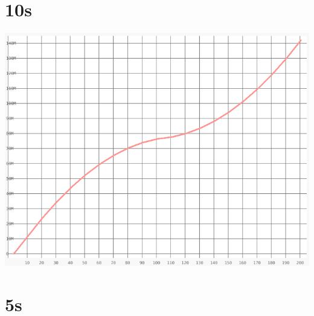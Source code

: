 \documentclass{article}
\begin{document}
\belowcaptionskip=-10pt


\section{10s}
    \noindent\begin{minipage}{.45\textwidth}
    
    \end{minipage}\hfill
    \begin{minipage}{.45\textwidth}
    
    \end{minipage}
    
    \begin{center}
        \includegraphics[angle=90]{set_a_10s/set_a_10s.png}
    \end{center}
\clearpage

\section{5s}
    \noindent\begin{minipage}{.45\textwidth}
    
    \end{minipage}\hfill
    \begin{minipage}{.45\textwidth}
    
    \end{minipage}
    
\end{document}

